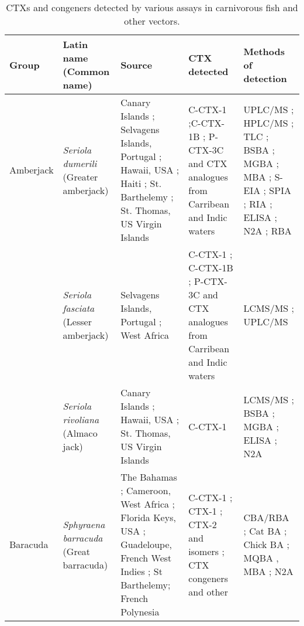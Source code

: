 \documentclass[12pt]{article}
\begin{document}
\FloatBarrier
\begin{longtable}{  | p{2cm} | p{3cm} | p{4.5cm}  | p{2cm} | p{3cm}  | }
\caption{CTXs and congeners detected by various assays in carnivorous fish and other vectors.}\\
\label{tbl:CarnTable}
\textbf{Group} & \textbf{Latin name} (Common name) & \textbf{Source} & \textbf{CTX detected} & \textbf{Methods of detection} \\
\hline
Amberjack &  \emph{Seriola dumerili} (Greater amberjack) & Canary Islands \cite{caillaud2012towards}; Selvagens Islands, Portugal \cite{otero2010first}; Hawaii, USA \cite{campora2008detection,hokama1977radioimmunoassay,hokama1983rapid,hokama1993evaluation}; Haiti \cite{poli1997identification}; St. Barthelemy \cite{vernoux1986heterogeneity}; St. Thomas, US Virgin Islands \cite{granade1976ciguatera} & C-CTX-1 \cite{poli1997identification};C-CTX-1B \cite{otero2010first}; P-CTX-3C and CTX analogues from Carribean and Indic waters \cite{otero2010first} & UPLC/MS \cite{otero2010first}; HPLC/MS \cite{poli1997identification}; TLC \cite{vernoux1986heterogeneity}; BSBA \cite{granade1976ciguatera}; MGBA \cite{campora2008detection,granade1976ciguatera}; MBA \cite{hokama1983rapid,hokama1993evaluation,vernoux1986heterogeneity}; S-EIA \cite{hokama1993evaluation}; SPIA \cite{otero2010first}; RIA \cite{campora2008detection,hokama1983rapid}; ELISA \cite{campora2008detection}; N2A \cite{caillaud2012towards,campora2008detection}; RBA \cite{} \\
  & \emph{Seriola fasciata} (Lesser amberjack) & Selvagens Islands, Portugal \cite{otero2010first}; West Africa \cite{boada2010ciguatera} & C-CTX-1 \cite{boada2010ciguatera}; C-CTX-1B \cite{otero2010first}; P-CTX-3C and CTX analogues from Carribean and Indic waters \cite{otero2010first} & LCMS/MS \cite{boada2010ciguatera}; UPLC/MS \cite{otero2010first}\\
 & \emph{Seriola rivoliana} (Almaco jack) & Canary Islands \cite{campora2010evaluating}; Hawaii, USA \cite{campora2008detection}; St. Thomas, US Virgin Islands \cite{granade1976ciguatera} & C-CTX-1 \cite{} & LCMS/MS \cite{}; BSBA \cite{granade1976ciguatera}; MGBA \cite{granade1976ciguatera}; ELISA \cite{campora2008detection,campora2010evaluating}; N2A \cite{campora2008detection,campora2010evaluating} \\
 \hline
Baracuda & \emph{Sphyraena barracuda} (Great barracuda) & The Bahamas \cite{o2012linking}; Cameroon, West Africa \cite{bienfang2008ciguatera}; Florida Keys, USA \cite{dechraoui2005use}; Guadeloupe, French West Indies \cite{pottier2003identification,pottier2001ciguatera}; St Barthelemy\cite{pottier2001ciguatera,vernoux1986heterogeneity}; French Polynesia \cite{bagnis1987use,chinain2014mail} & C-CTX-1 \cite{dechraoui2005use,pottier2003identification}; CTX-1 \cite{pottier2003identification}; CTX-2 and isomers \cite{pottier2003identification}; CTX congeners and other \cite{pottier2003identification}& CBA/RBA \cite{chinain2014mail}; Cat BA \cite{bagnis1987use}; Chick BA \cite{pottier2001ciguatera}; MQBA \cite{bagnis1987use}, MBA \cite{bagnis1987use,pottier2002characterisation,pottier2003identification}; N2A \cite{o2012linking} \\

\end{longtable}
\end{document}
